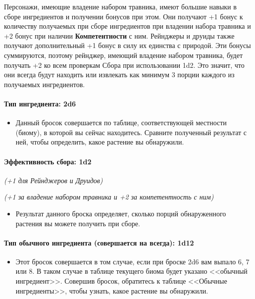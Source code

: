 \documentclass[a4paper, 9pt, twocolumn]{book}
\begin{document}
	Персонажи, имеющие владение набором травника, имеют большие навыки в сборе ингредиентов и получении бонусов при этом. Они получают +1 бонус к количеству получаемых при сборе ингредиентов при владении набора травника и +2 бонус при наличии \textbf{Компетентности} с ним. Рейнджеры и друиды также получают дополнительный +1 бонус в силу их единства с природой. Эти бонусы суммируются, поэтому рейнджер, имеющий владение набором травника, будет получать +2 ко всем проверкам Сбора при использовании 1d2. Это значит, что они всегда будут находить или извлекать как минимум 3 порции каждого из получаемых ингредиентов.
	
	\paragraph*{Тип ингредиента: 2d6}
	\noindent
	\begin{itemize}
		\item Данный бросок совершается по таблице, соответствующей местности (биому), в которой вы сейчас находитесь. Сравните полученный результат с ней, чтобы определить, какое растение вы обнаружили.
	\end{itemize}
	
	\paragraph*{Эффективность сбора: 1d2}
	
	\noindent\textit{(+1 для Рейнджеров и Друидов)}
	
	\noindent\textit{(+1 за владение набором травника и +2 за компетентность с ним)}
	\noindent
	\begin{itemize}
		\item Результат данного броска определяет, сколько порций обнаруженного растения вы можете получить при сборе. 
	\end{itemize}

	\paragraph*{Тип обычного ингредиента (совершается на всегда): 1d12}
	
	\begin{itemize}
		\item Этот бросок совершается в том случае, если при броске 2d6 вам выпало 6, 7 или 8. В таком случае в таблице текущего биома будет указано <<обычный ингредиент>>. Совершив бросок, обратитесь к таблице <<Обычные ингредиенты>>, чтобы узнать, какое растение вы обнаружили.
	\end{itemize}
	
\end{document}
